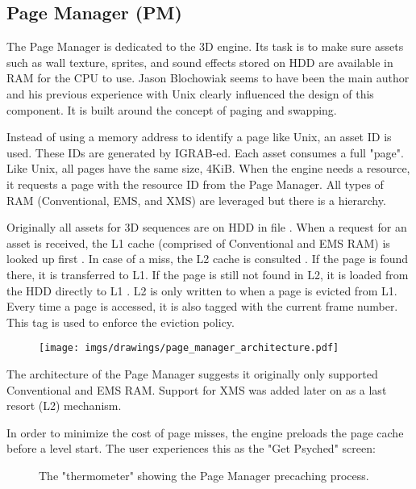 \documentclass[book.tex]{subfiles}
\begin{document}
\subsection{Page Manager (PM)}
The Page Manager is dedicated to the 3D engine. Its task is to make sure assets such as wall texture, sprites, and sound effects stored on HDD are available in RAM for the CPU to use. Jason Blochowiak seems to have been the main author and his previous experience with Unix clearly influenced the design of this component. It is built around the concept of paging and swapping. \\
\par
Instead of using a memory address to identify a page like Unix, an asset ID is used. These IDs are generated by IGRAB-ed. Each asset consumes a full "page". Like Unix, all pages have the same size, 4KiB. When the engine needs a resource, it requests a page with the resource ID from the Page Manager. All types of RAM (Conventional, EMS, and XMS) are leveraged but there is a hierarchy.\\
\par
Originally all assets for 3D sequences are on HDD in file . When a request for an asset is received, the L1 cache (comprised of Conventional and EMS RAM) is looked up first . In case of a miss, the L2 cache is consulted . If the page is found there, it is transferred to L1. If the page is still not found in L2, it is loaded from the HDD directly to L1 . L2 is only written to when a page is evicted from L1. Every time a page is accessed, it is also tagged with the current frame number. This tag is used to enforce the eviction policy.
 \par
\begin{figure}[H]
\centering
 \texttt{[image: imgs/drawings/page\_manager\_architecture.pdf]}
 \end{figure}
 \par
 The architecture of the Page Manager suggests it originally only supported Conventional and EMS RAM. Support for XMS was added later on as a last resort (L2) mechanism.\\
 \par
In order to minimize the cost of page misses, the engine preloads the page cache before a level start. The user experiences this as the "Get Psyched" screen:
 \par
\begin{figure}[H]
\centering
 \caption{The "thermometer" showing the Page Manager precaching process.}
 \end{figure}
\end{document}
